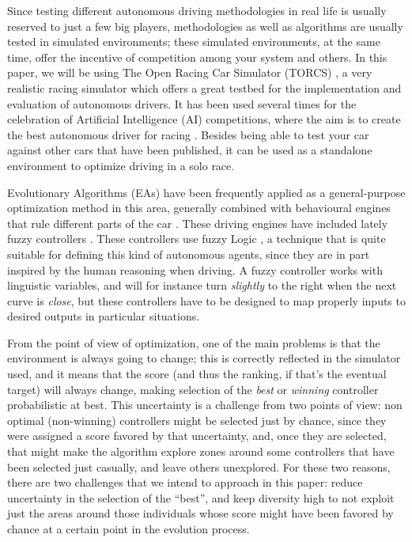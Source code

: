 \documentclass[10pt,journal,compsoc]{IEEEtran}
\begin{document}
Since testing different autonomous driving methodologies in real life is
usually reserved to just a few big players, methodologies 
as well as algorithms are usually tested in simulated environments;
these simulated environments, at the same time, offer the incentive of
competition among your system and others. In this paper, we will be
using The Open Racing Car Simulator (TORCS) \cite{torcs4}, a very
realistic racing simulator which offers a great testbed for the
implementation and evaluation of autonomous drivers.  
It has been used several times for the celebration of Artificial
Intelligence (AI) competitions, where the aim is to create the best
autonomous driver for racing
\cite{SimulatedCarRacing-2008,SimulatedCarRacing-2010,manualTORCS}. Besides being able to test your car against other cars that have been published, it can be used as a standalone environment to optimize driving in a
solo race. 

Evolutionary Algorithms (EAs) \cite{EAs_Back96} have been frequently
applied as a general-purpose optimization method in this area,
generally combined with behavioural engines that rule different parts
of the car
\cite{CarRacing_Pelta09,SAES2012,Autopia2012}. These
driving engines have included lately fuzzy controllers
\cite{Guadarrama2008, LFAG, PerezEvolvingFuzzy09}. These controllers
use fuzzy Logic \cite{Fuzzy2011}, a  technique that is quite suitable
for defining this kind of autonomous agents, since they are in part
inspired by the human reasoning when driving. A fuzzy controller works
with linguistic variables, and will for instance turn {\em slightly}
to the right when the next curve is {\em close}, but these controllers
have to be designed to map properly inputs to desired outputs in
particular situations. 

From the point of view of optimization, one of the main problems is
that the environment is always going to change; this is correctly
reflected in the simulator used, and it means that the score (and
thus the ranking, if that's the eventual target) will always change,
making selection of the {\em best} or {\em winning} controller
probabilistic at best. This uncertainty is a challenge from two points
of view: non optimal (non-winning) controllers might be selected just
by chance, since they were assigned a score favored by that
uncertainty, and, once they are selected, that might make the
algorithm explore zones around some controllers that have been
selected just casually, and leave others unexplored. For these two
reasons, there are two challenges that we intend to approach in this
paper: reduce uncertainty in the selection of the ``best'', and keep
diversity high to not exploit just the areas around those individuals
whose score might have been favored by chance at a certain point in
the evolution process.
\end{document}
